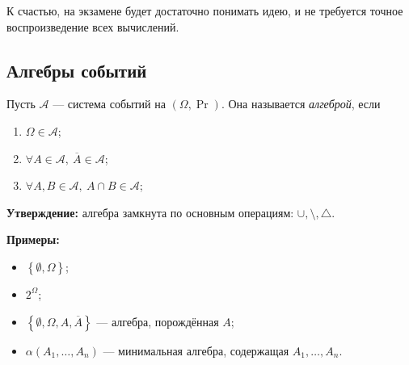 К счастью, на экзамене будет достаточно понимать идею, и не требуется точное воспроизведение всех 
вычислений.

\subsection{Алгебры событий}
\begin{definition}
    Пусть $\mathcal{A}$ --- система событий на $(\Omega, \Pr)$. Она называется \emph{алгеброй}, если
    
    \begin{enumerate}
        \item $\Omega \in \mathcal{A}$;
        \item $\forall A \in \mathcal{A},\ \overline{A} \in \mathcal{A}$;
        \item $\forall A, B \in \mathcal{A},\ A\cap B \in \mathcal{A}$;
    \end{enumerate}
\end{definition}

\noindent \textbf{Утверждение:} алгебра замкнута по основным операциям: $\cup, \setminus, \triangle$.

\noindent\textbf{Примеры:}

\begin{itemize}
    \item $\left\{ \emptyset, \Omega \right\}$;
    \item $2^{\Omega}$;
    \item $\left\{ \emptyset, \Omega, A, \overline{A}\right\}$ --- алгебра, порождённая $A$;
    \item $\alpha\left( A_1, \ldots, A_n \right) $ --- минимальная алгебра, содержащая $A_1, \ldots, A_n$.
\end{itemize}